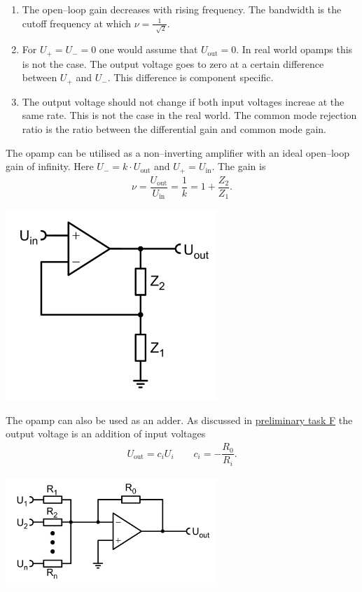 \documentclass[a4paper,10pt]{article}
\newenvironment{Figure}
        {\par\medskip\noindent\minipage{\linewidth}}
        {\endminipage\par\medskip}
\numberwithin{equation}{section}
\begin{document}
\begin{multicols}{2}
\begin{enumerate}[label=--]
		\item The open--loop gain decreases with rising frequency.
		      The bandwidth is the cutoff frequency at which $\nu =\tfrac{1}{\,\sqrt[]{2}}$.
		\item For $U_+=U_-=0$ one would assume that $U_\text{out}=0$.
		      In real world opamps this is not the case.
		      The output voltage goes to zero at a certain difference between $U_+$ and $U_-$.
		      This difference is component specific.
		\item The output voltage should not change if both input voltages increae at the same rate.
		      This is not the case in the real world.
		      The common mode rejection ratio is the ratio between the differential gain and common mode gain.
	\end{enumerate}
	The opamp can be utilised as a non--inverting amplifier with an ideal open--loop gain of infinity.
	Here $U_-=k\cdot U_\text{out}$ and $U_+=U_\text{in}$.
	The gain is
	\begin{align}
		\nu =\dfrac{U_\text{out}}{U_\text{in}}=\dfrac{1}{k}=1+\dfrac{Z_2}{Z_1}
		.\end{align}
	\begin{Figure}
		\centering
		\includegraphics[width=0.6\textwidth]{noninverting_amp.png}
	\end{Figure}
	\noindent The opamp can also be used as an adder.
	As discussed in \hyperref[pre:F]{preliminary task F} the output voltage is an addition of input voltages
	\begin{align}
		U_\text{out}=c_iU_i\qquad c_i=-\dfrac{R_0}{R_i}
		.\end{align}
	\begin{Figure}
		\centering
		\includegraphics[width=0.6\textwidth]{adder.png}

\end{Figure}
\end{multicols}
\end{document}
